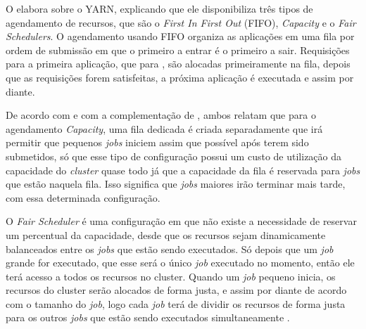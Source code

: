                 O  elabora sobre o YARN, explicando que ele disponibiliza três tipos de agendamento de recursos,
                que são o \textit{First In First Out} (FIFO), \textit{Capacity} e o \textit{Fair Schedulers}. O agendamento usando FIFO
                organiza as aplicações em uma fila por ordem de submissão em que o primeiro a entrar é o primeiro a sair. Requisições
                para a primeira aplicação, que para , são alocadas primeiramente na fila, depois que as requisições
                forem satisfeitas, a próxima aplicação é executada e assim por diante.

                De acordo com  e com a complementação de , ambos relatam que para o
                agendamento \textit{Capacity}, uma fila dedicada é criada separadamente que irá permitir que pequenos \textit{jobs}
                iniciem assim que possível após terem sido submetidos, só que esse tipo de configuração possui um custo de utilização
                da capacidade do \textit{cluster} quase todo já que a capacidade da fila é reservada para \textit{jobs} que estão
                naquela fila. Isso significa que \textit{jobs} maiores irão terminar mais tarde, com essa determinada configuração.

                O \textit{Fair Scheduler} é uma configuração em que não existe a necessidade de reservar um percentual da
                capacidade, desde que os recursos sejam dinamicamente balanceados entre os \textit{jobs} que estão sendo executados.
                Só depois que um \textit{job} grande for executado, que esse será o único \textit{job} executado no momento, então ele
                terá acesso a todos os recursos no cluster. Quando um \textit{job} pequeno inicia, os recursos do cluster serão alocados de
                forma justa, e assim por diante de acordo com o tamanho do \textit{job}, logo cada \textit{job} terá de dividir os recursos de
                forma justa para os outros \textit{jobs} que estão sendo executados simultaneamente \cite{white2015}.

